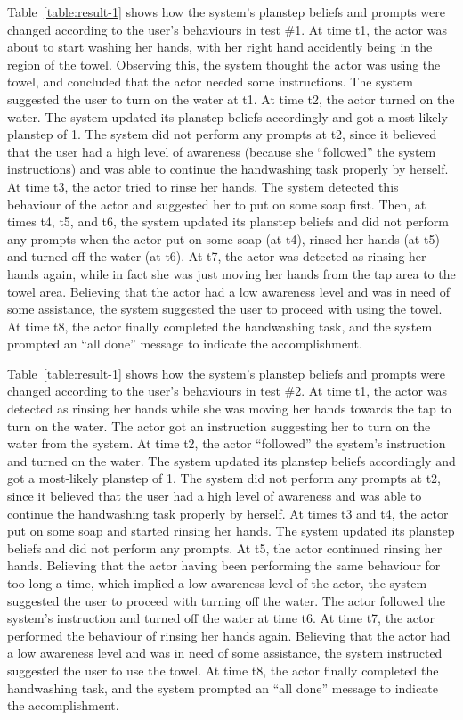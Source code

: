 Table~\ref{table:result-1} shows how the system's planstep beliefs and prompts were changed according to the user's behaviours in test \#1. At time t1, the actor was about to start washing her hands, with her right hand accidently being in the region of the towel. Observing this, the system thought the actor was using the towel, and concluded that the actor needed some instructions. The system suggested the user to turn on the water at t1. At time t2, the actor turned on the water. The system updated its planstep beliefs accordingly and got a most-likely planstep of 1. The system did not perform any prompts at t2, since it believed that the user had a high level of awareness (because she ``followed'' the system instructions) and was able to continue the handwashing task properly by herself. At time t3, the actor tried to rinse her hands. The system detected this behaviour of the actor and suggested her to put on some soap first. Then, at times t4, t5, and t6, the system updated its planstep beliefs and did not perform any prompts when the actor put on some soap (at t4), rinsed her hands (at t5) and turned off the water (at t6). At t7, the actor was detected as rinsing her hands again, while in fact she was just moving her hands from the tap area to the towel area. Believing that the actor had a low awareness level and was in need of some assistance, the system suggested the user to proceed with using the towel. At time t8, the actor finally completed the handwashing task, and the system prompted an ``all done'' message to indicate the accomplishment.

Table~\ref{table:result-1} shows how the system's planstep beliefs and prompts were changed according to the user's behaviours in test \#2. At time t1, the actor was detected as rinsing her hands while she was moving her hands towards the tap to turn on the water. The actor got an instruction suggesting her to turn on the water from the system. At time t2, the actor ``followed'' the system's instruction and turned on the water. The system updated its planstep beliefs accordingly and got a most-likely planstep of 1. The system did not perform any prompts at t2, since it believed that the user had a high level of awareness and was able to continue the handwashing task properly by herself. At times t3 and t4, the actor put on some soap and started rinsing her hands. The system updated its planstep beliefs and did not perform any prompts. At t5, the actor continued rinsing her hands. Believing that the actor having been performing the same behaviour for too long a time, which implied a low awareness level of the actor, the system suggested the user to proceed with turning off the water. The actor followed the system's instruction and turned off the water at time t6. At time t7, the actor performed the behaviour of rinsing her hands again. Believing that the actor had a low awareness level and was in need of some assistance, the system instructed suggested the user to use the towel. At time t8, the actor finally completed the handwashing task, and the system prompted an ``all done'' message to indicate the accomplishment. 

